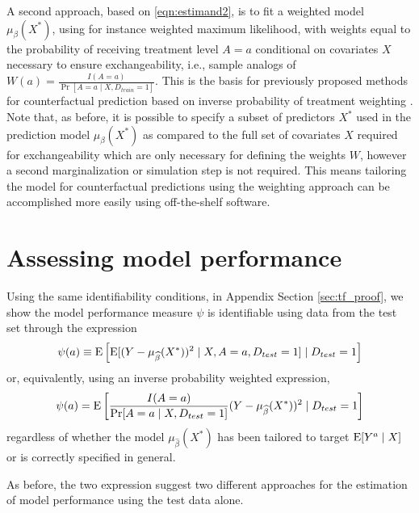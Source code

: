A second approach, based on \ref{eqn:estimand2}, is to fit a weighted model $\mu_\beta(X^*)$, using for instance weighted maximum likelihood, with weights equal to the probability of receiving treatment level $A = a$ conditional on covariates $X$ necessary to ensure exchangeability, i.e., sample analogs of $W(a) = \frac{I(A = a)}{\Pr[A = a \mid X, D_{train} = 1]}$. This is the basis for previously proposed methods for counterfactual prediction based on inverse probability of treatment weighting \cite{sperrin_using_2018, van_geloven_prediction_2020}. Note that, as before, it is possible to specify a subset of predictors $X^*$ used in the prediction model $\mu_\beta(X^*)$ as compared to the full set of covariates $X$ required for exchangeability which are only necessary for defining the weights $W$, however a second marginalization or simulation step is not required. This means tailoring the model for counterfactual predictions using the weighting approach can be accomplished more easily using off-the-shelf software.


\section{Assessing model performance} \label{sec:performance}

Using the same identifiability conditions, in Appendix Section \ref{sec:tf_proof}, we show the model performance measure $\psi$ is identifiable using data from the test set through the expression
\begin{equation}\label{eqn:mse1}
    \psi(a) \equiv \operatorname{E}\left[\operatorname{E}[(Y - \mu_{\widehat{\beta}}(X^*))^2 \mid X, A=a, D_{test} = 1] \mid D_{test} = 1\right]
\end{equation}
or, equivalently, using an inverse probability weighted expression, 
\begin{equation}\label{eqn:mse2}
    \psi(a) = \operatorname{E}\left[\frac{I(A = a)}{\Pr[A = a \mid X, D_{test} = 1]}(Y - \mu_{\widehat{\beta}}(X^*))^2 \mid D_{test} = 1\right]
\end{equation}
regardless of whether the model $\mu_{\widehat{\beta}}(X^*)$ has been tailored to target $\operatorname{E}[Y^a \mid X]$ or is correctly specified in general. 

As before, the two expression suggest two different approaches for the estimation of model performance using the test data alone. 

